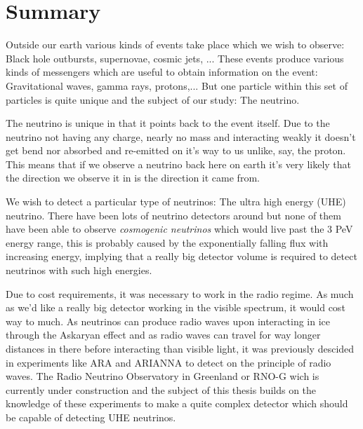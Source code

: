\documentclass[11pt,a4paper,faculty=we,language=en,doctype=report]{cls/ugent-doc}
\renewcommand{\ULthickness}{2pt} %
\begin{document}

\maketitle
\renewcommand{\ULthickness}{1pt}

\shipout\null
\newpage
\chapter*{Summary}
Outside our earth various kinds of events take place which we wish to 
observe: Black hole outbursts, supernovae, cosmic jets, ...
These events produce various kinds of messengers which are useful to obtain
information on the event: Gravitational waves, gamma rays, protons,...
But one particle within this set of particles is quite unique and
the subject of our study: The neutrino. 

The neutrino is unique in that it points back to the event itself.
Due to the neutrino not having any charge, nearly no mass and 
interacting weakly it doesn't get bend nor absorbed and re-emitted 
on it's way to us unlike, say, the proton. This means that if we observe
a neutrino back here on earth it's very likely that the direction we observe
it in is the direction it came from.

We wish to detect a particular type of neutrinos: The ultra high energy (UHE)
neutrino.  There have been lots of neutrino detectors around but none of them
have been able to observe \textit{cosmogenic neutrinos} which would live past
the 3 PeV energy range, this is probably caused by the exponentially falling
flux with increasing energy, implying that a really big detector volume is
required to detect neutrinos with such high energies. 

Due to cost requirements, it was necessary to work in the radio regime.  As
much as we'd like a really big detector working in the visible spectrum, it
would cost way to much. As neutrinos can produce radio waves upon interacting
in ice through the Askaryan effect and as radio waves can travel for way longer
distances in there before interacting than visible light, it was previously
descided in experiments like ARA and ARIANNA to detect on the principle of
radio waves. The Radio Neutrino Observatory in Greenland or RNO-G wich is
currently under construction and the subject of this thesis builds on the
knowledge of these experiments to make a quite complex detector which
should be capable of detecting UHE neutrinos.
\end{document}
